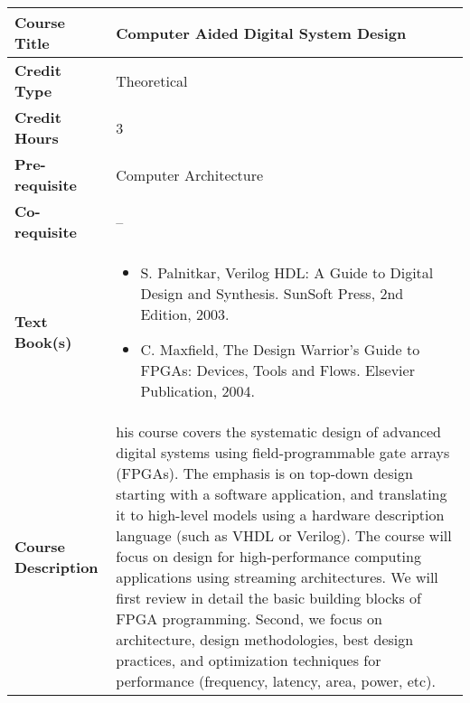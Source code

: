 \documentclass[11pt]{article}
\begin{document}
\begin{table}[h!]
\begin{tabular}{|l|l|}
\hline
\textbf{Course Title}       &   Computer Aided Digital System Design\\ \hline
\textbf{Credit Type}        &   Theoretical \\ \hline
\textbf{Credit Hours}       & 3 \\ \hline
\textbf{Pre-requisite}       & Computer Architecture \\ \hline
\textbf{Co-requisite}       & -- \\ \hline
\textbf{Text Book(s)}       & \begin{minipage}{.70\textwidth}
\begin{itemize} \itemsep-0.4em
	\vspace{3mm}
	\item S. Palnitkar, Verilog HDL: A Guide to Digital Design and Synthesis. SunSoft Press, 2nd Edition, 2003.
	\item C. Maxfield, The Design Warrior's Guide to FPGAs: Devices, Tools and Flows. Elsevier Publication, 2004.
	\vspace{3mm}
\end{itemize}
\end{minipage}\\ \hline
\textbf{Course Description} & \begin{minipage}{.70\textwidth}
\vspace{3mm}
his course covers the systematic design of advanced digital systems using field-programmable gate arrays (FPGAs). The emphasis is on top-down design starting with a software application, and translating it to high-level models using a hardware description language (such as VHDL or Verilog). The course will focus on design for high-performance computing applications using streaming architectures. We will first review in detail the basic building blocks of FPGA programming. Second, we focus on architecture, design methodologies, best design practices, and optimization techniques for performance (frequency, latency, area, power, etc).
\vspace{3mm}
\end{minipage} \\ \hline
\end{tabular}
\end{table}
\end{document}
